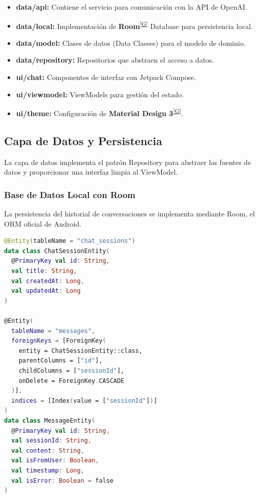 \documentclass[12pt,a4paper]{report}
\numberwithin{figure}{section}
\begin{document}
\begin{itemize}
  \item \textbf{data/api:} Contiene el servicio para comunicación con la API de OpenAI.
  \item \textbf{data/local:} Implementación de \textbf{Room}\textsuperscript{\hyperref[glos:room]{[G]}} Database para persistencia local.
  \item \textbf{data/model:} Clases de datos (Data Classes) para el modelo de dominio.
  \item \textbf{data/repository:} Repositorios que abstraen el acceso a datos.
  \item \textbf{ui/chat:} Componentes de interfaz con Jetpack Compose.
  \item \textbf{ui/viewmodel:} ViewModels para gestión del estado.
  \item \textbf{ui/theme:} Configuración de \textbf{Material Design 3}\textsuperscript{\hyperref[glos:material]{[G]}}.
\end{itemize}

\vspace{1em}
\subsection{Capa de Datos y Persistencia}
\label{subsec:capa_datos}

La capa de datos implementa el patrón Repository para abstraer las fuentes de datos y proporcionar una interfaz limpia al ViewModel.

\subsubsection{Base de Datos Local con Room}
\label{subsubsec:room_database}

La persistencia del historial de conversaciones se implementa mediante Room, el ORM oficial de Android.

\begin{lstlisting}[style=angelcode,language=Kotlin,caption={Definición de entidades Room para persistencia}]
@Entity(tableName = "chat_sessions")
data class ChatSessionEntity(
  @PrimaryKey val id: String,
  val title: String,
  val createdAt: Long,
  val updatedAt: Long
)

@Entity(
  tableName = "messages",
  foreignKeys = [ForeignKey(
    entity = ChatSessionEntity::class,
    parentColumns = ["id"],
    childColumns = ["sessionId"],
    onDelete = ForeignKey.CASCADE
  )],
  indices = [Index(value = ["sessionId"])]
)
data class MessageEntity(
  @PrimaryKey val id: String,
  val sessionId: String,
  val content: String,
  val isFromUser: Boolean,
  val timestamp: Long,
  val isError: Boolean = false
)
\end{lstlisting}
\end{document}
